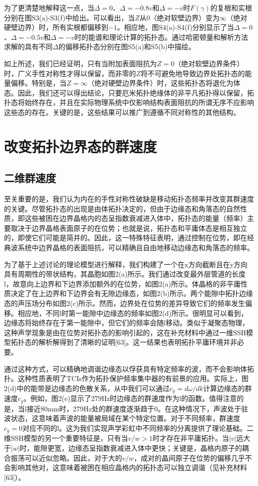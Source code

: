 为了更清楚地解释这一点，当\(\Delta = 0\)、\(\Delta = -0.8v\)和\(\Delta = -v\)时\(F(\gamma)\)的复根和实根分别在图S3(a)-S3(f)中给出。可以看出，当\(Z\)从\(0\)（绝对软壁边界）变为\(\infty\)（绝对硬壁边界）时，所有实根都偏移到\(-1\)。相应地，图S4(a)-S4(f)分别显示了当\(\Delta = 0\)、\(\Delta = -0.5v\)和\(\Delta = -v\)时的能谱和理论计算的拓扑态。通过哈密顿量和解析方法求解的具有不同\(\Delta\)的偏移拓扑态分别在图S5(a)和S5(b)中描绘。

如上所述，我们已经证明，只有当附加表面阻抗为\(Z = 0\)（绝对软壁边界条件）时，广义手性对称性才得以保留，而非零的\(Z\)将不可避免地导致边界处拓扑态的能量偏移。特别是，当\(Z = \infty\)（绝对硬壁边界条件）时，这些拓扑态将退化为体态。因此，我们还可以得出结论，只要厄米拓扑绝缘体的非平凡拓扑得以保留，拓扑态将始终存在，并且在实际物理系统中仅影响结构表面阻抗的所谓无序不应影响这些态的存在。关键的是，这些结果可以推广到遵循不同对称性的其他结构。



\section{改变拓扑边界态的群速度}
\subsection{二维群速度}
至关重要的是，我们认为内在的手性对称性破缺是移动拓扑态频率并改变其群速度的关键。尽管拓扑态的出现是由体拓扑决定的，但由于边缘态和角落态的自然性质，即这些被困在边界晶格内的态呈指数衰减进入体中，拓扑态的能量（频率）主要取决于边界晶格表面原子的在位势；也就是说，拓扑态和平庸体态是相互独立的，即使它们可能是简并的。因此，这一特殊特征表明，通过控制在位势，即在经典波系统中边界晶格的表面阻抗，可以精确且自由地移动边缘态和角落态的频率。

为了基于上述讨论的理论模型进行解释，我们构建了一个在x方向截断且在y方向具有周期性的带状结构，其晶胞如图2(a)所示。我们通过改变最外层管道的长度l，故意向上边界和下边界添加额外的在位势，如图2(a)所示。体晶格的非平庸性质决定了在上边界和下边界会有无隙边缘态，如图2(b)所示。两个能隙中拓扑边缘态的声压场分布如图2(c)所示。然而，边界处在位势的差异导致它们的频率发生偏移。相应地，不同l时第一能隙中边缘态的频率如图2(d)所示。很明显可以看到，边缘态将始终存在于第一能隙中，但它们的频率会随l移动。类似于凝聚态物理，这种声学现象是由在位势对拓扑态的影响引起的，这在补充材料中通过一维SSH模型拓扑态的解析解得到了清晰的证明[63]。这一结果也表明拓扑平庸环境并非必要。

通过这种方式，可以精确地调谐边缘态以俘获具有特定频率的波，而不会影响体拓扑。这种性质表明了TCIs作为拓扑保护频率集中器的有前景的应用。实际上，图2(d)中的能带是边缘态的色散关系，从中我们可以通过$c_g = d\omega/dk$计算边缘态的群速度$c_g$。例如，图2(e)显示了279Hz时边缘态的群速度作为l的函数。值得注意的是，当l接近80mm时，279Hz处的群速度逐渐趋于0。在这种情况下，声波处于驻波状态，这意味着声波的能量被局域在某个特定位置。对于不同频率，群速度$c_g = 0$对应不同的l。这为我们实现声学彩虹中不同频率的分离提供了理论基础。二维SSH模型的另一个重要特征是，只有当$v/w > 1$时才存在非平庸拓扑。当$|v|$远大于$|w|$时，能隙更宽，边缘态呈指数衰减进入体中更快；关键是，晶格内原子的耦合振荡可以近似忽略。因此，对于大的$v/w$，成对的晶间原子在位势的偏移几乎不会影响其他对，这意味着被困在相应晶格内的拓扑态可以独立调谐（见补充材料[63]）。

